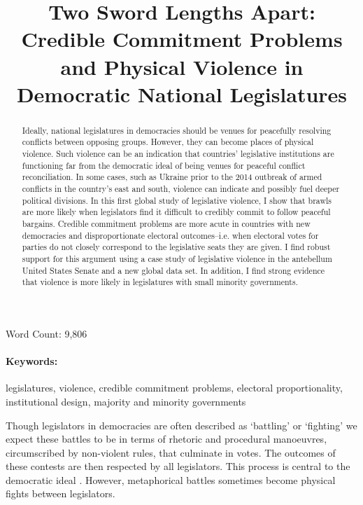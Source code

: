 \documentclass[a4paper]{article}\usepackage[]{graphicx}\usepackage[]{color}
\title{Two Sword Lengths Apart: Credible Commitment Problems and Physical Violence in Democratic National Legislatures}
\begin{document}
\maketitle

\begin{center}
Word Count: 9,806
\end{center}

\begin{abstract}
Ideally, national legislatures in democracies should be venues for peacefully resolving conflicts between opposing groups. However, they can become places of physical violence. Such violence can be an indication that countries' legislative institutions are functioning far from the democratic ideal of being venues for peaceful conflict reconciliation. In some cases, such as Ukraine prior to the 2014 outbreak of armed conflicts in the country's east and south, violence can indicate and possibly fuel deeper political divisions. In this first global study of legislative violence, I show that brawls are more likely when legislators find it difficult to credibly commit to follow peaceful bargains. Credible commitment problems are more acute in countries with new democracies and disproportionate electoral outcomes--i.e. when electoral votes for parties do not closely correspond to the legislative seats they are given. I find robust support for this argument using a case study of legislative violence in the antebellum United States Senate and a new global data set. In addition, I find strong evidence that violence is more likely in legislatures with small minority governments.
\end{abstract}


\paragraph{Keywords:} legislatures, violence, credible commitment problems, electoral proportionality, institutional design, majority and minority governments

\vspace{0.3cm}


Though legislators in democracies are often described as `battling' or `fighting' we expect these battles to be in terms of rhetoric and procedural manoeuvres, circumscribed by non-violent rules, that culminate in votes. The outcomes of these contests are then respected by all legislators. This process is central to the democratic ideal  \cite[220]{Schwarzmantel2010}. However, metaphorical battles sometimes become physical fights between legislators.
\end{document}
